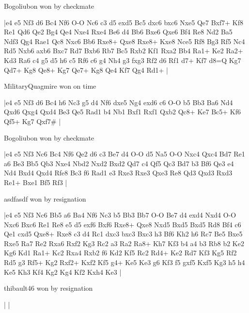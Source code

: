 \showboard

Bogoliubon won by checkmate

\makegametitle
|e4 e5 Nf3 d6 Bc4 Nf6 O-O Nc6 c3 d5 exd5 Bc5 dxc6 bxc6 Nxe5 Qe7 Bxf7+ Kf8 Re1 Qd6 Qe2 Bg4 Qe4 Nxe4 Rxe4 Be6 d4 Bb6 Bxe6 Qxe6 Bf4 Re8 Nd2 Ba5 Ndf3 Qg4 Rae1 Qc8 Nxc6 Bb6 Rxe8+ Qxe8 Rxe8+ Kxe8 Nce5 Rf8 Bg3 Rf5 Nc4 Rd5 Nxb6 axb6 Bxc7 Rd7 Bxb6 Rb7 Bc5 Rxb2 Kf1 Rxa2 Bb4 Ra1+ Ke2 Ra2+ Kd3 Ra6 c4 g5 d5 h6 c5 Rf6 c6 g4 Nh4 g3 fxg3 Rf2 d6 Rf1 d7+ Kf7 d8=Q Kg7 Qd7+ Kg8 Qe8+ Kg7 Qe7+ Kg8 Qe4 Kf7 Qg4 Rd1+  |

\showboard

MilitaryQuagmire won on time

\makegametitle
|e4 e5 Nf3 d6 Bc4 h6 Nc3 g5 d4 Nf6 dxe5 Ng4 exd6 c6 O-O b5 Bb3 Ba6 Nd4 Qxd6 Qxg4 Qxd4 Be3 Qe5 Rad1 b4 Nb1 Bxf1 Rxf1 Qxb2 Qc8+ Ke7 Bc5+ Kf6 Qf5+ Kg7 Qxf7\#  |

\showboard

Bogoliubon won by checkmate

\makegametitle
|e4 e5 Nf3 Nc6 Bc4 Nf6 Qe2 d6 c3 Be7 d4 O-O d5 Na5 O-O Nxc4 Qxc4 Bd7 Re1 a6 Be3 Bb5 Qb3 Nxe4 Nbd2 Nxd2 Bxd2 Qd7 c4 Qf5 Qc3 Bd7 b3 Bf6 Qe3 e4 Nd4 Bxd4 Qxd4 Rfe8 Bc3 f6 Rad1 e3 Rxe3 Rxe3 Qxe3 Re8 Qd3 Qxd3 Rxd3 Re1+ Bxe1 Bf5 Rf3  |

\showboard

asdfasdf won by resignation

\makegametitle
|e4 e5 Nf3 Nc6 Bb5 a6 Ba4 Nf6 Nc3 b5 Bb3 Bb7 O-O Be7 d4 exd4 Nxd4 O-O Nxc6 Bxc6 Re1 Re8 e5 d5 exf6 Bxf6 Rxe8+ Qxe8 Nxd5 Bxd5 Bxd5 Rd8 Bf4 c6 Qe1 cxd5 Qxe8+ Rxe8 c3 d4 Rc1 dxc3 bxc3 Bxc3 h3 Bf6 Kh2 h6 Rc7 Be5 Bxe5 Rxe5 Ra7 Re2 Rxa6 Rxf2 Kg3 Rc2 a3 Ra2 Ra8+ Kh7 Kf3 b4 a4 b3 Rb8 b2 Ke2 Kg6 Kd1 Ra1+ Kc2 Rxa4 Rxb2 f6 Kd2 Kf5 Rc2 Rd4+ Ke2 Rd7 Kf3 Kg5 Rf2 Rd5 g3 Rf5+ Kg2 Rxf2+ Kxf2 Kf5 g4+ Ke5 Ke3 g6 Kf3 f5 gxf5 Kxf5 Kg3 h5 h4 Ke5 Kh3 Kf4 Kg2 Kg4 Kf2 Kxh4 Ke3  |

\showboard

thibault46 won by resignation

\makegametitle
| |

\showboard

